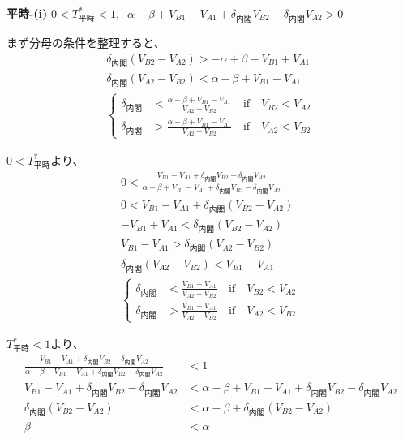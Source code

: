 \documentclass[main.tex]{subfiles}
\begin{document}
\bigskip
\noindent
\textbf{平時-(i)}\; $0<T^*_{平時}<1,\;\; \alpha-\beta + V_{B1}-V_{A1} + \delta_{内閣}V_{B2} - \delta_{内閣}V_{A2} > 0$

まず分母の条件を整理すると、
\begin{align*}
    \delta_{内閣}(V_{B2} - V_{A2}) > -\alpha+\beta - V_{B1}+V_{A1} \\
    \delta_{内閣}(V_{A2} - V_{B2}) < \alpha-\beta + V_{B1}-V_{A1}\\
    \begin{cases}
        \delta_{内閣} &< \frac{\alpha-\beta + V_{B1}-V_{A1}}{V_{A2} - V_{B2}} \quad\text{if}\quad V_{B2} < V_{A2}\\
        \delta_{内閣} &> \frac{\alpha-\beta + V_{B1}-V_{A1}}{V_{A2} - V_{B2}} \quad\text{if}\quad V_{A2} < V_{B2}
    \end{cases}
\end{align*}

$0<T^*_{平時}$より、
\begin{align*}
    0 < \frac{ V_{B1} - V_{A1} +\delta_{内閣}V_{B2} - \delta_{内閣}V_{A2} }{ \alpha-\beta + V_{B1}-V_{A1} + \delta_{内閣}V_{B2} - \delta_{内閣}V_{A2} }\\
    0 <  V_{B1} - V_{A1} +\delta_{内閣}(V_{B2} - V_{A2})\\
    -V_{B1} + V_{A1} < \delta_{内閣}(V_{B2} - V_{A2})\\
    V_{B1} - V_{A1} > \delta_{内閣}(V_{A2} - V_{B2})\\
    \delta_{内閣}(V_{A2} - V_{B2}) < V_{B1} - V_{A1}\\
    \begin{cases}
        \delta_{内閣} &< \frac{V_{B1} - V_{A1}}{V_{A2} - V_{B2}} \quad\text{if}\quad V_{B2} < V_{A2}\\
        \delta_{内閣} &> \frac{V_{B1} - V_{A1}}{V_{A2} - V_{B2}} \quad\text{if}\quad V_{A2} < V_{B2}
      \end{cases}
\end{align*}


$T^*_{平時}<1$より、
\begin{align*}
    \frac{ V_{B1} - V_{A1} +\delta_{内閣}V_{B2} - \delta_{内閣}V_{A2} }{ \alpha-\beta + V_{B1}-V_{A1} + \delta_{内閣}V_{B2} - \delta_{内閣}V_{A2} } &< 1\\
    V_{B1} - V_{A1} +\delta_{内閣}V_{B2} - \delta_{内閣}V_{A2} &< \alpha-\beta + V_{B1}-V_{A1} + \delta_{内閣}V_{B2} - \delta_{内閣}V_{A2}\\
    \delta_{内閣}(V_{B2} - V_{A2}) &< \alpha-\beta + \delta_{内閣}(V_{B2} - V_{A2})\\
    \beta &< \alpha
\end{align*}
\end{document}
